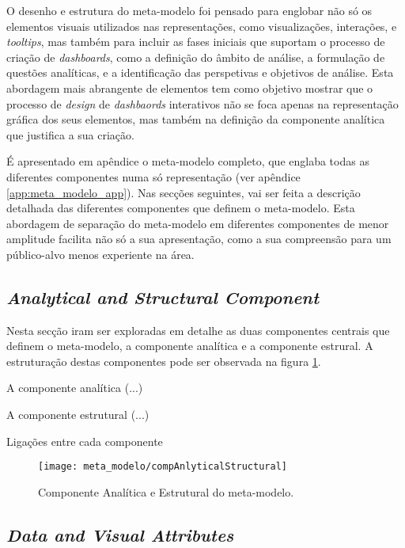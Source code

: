 O desenho e estrutura do meta-modelo foi pensado para englobar não só os elementos visuais utilizados nas representações, como visualizações, interações, e \textit{tooltips}, mas também para incluir as fases iniciais que suportam o processo de criação de \textit{dashboards}, como a definição do âmbito de análise, a formulação de questões analíticas, e a identificação das perspetivas e objetivos de análise. Esta abordagem mais abrangente de elementos tem como objetivo mostrar que o processo de \textit{design} de \textit{dashbaords} interativos não se foca apenas na representação gráfica dos seus elementos, mas também na definição da componente analítica que justifica a sua criação.

É apresentado em apêndice o meta-modelo completo, que englaba todas as diferentes componentes numa só representação (ver apêndice \ref{app:meta_modelo_app}). Nas secções seguintes, vai ser feita a descrição detalhada das diferentes componentes que definem o meta-modelo. Esta abordagem de separação do meta-modelo em diferentes componentes de menor amplitude facilita não só a sua apresentação, como a sua compreensão para um público-alvo menos experiente na área.

\subsection{\textit{Analytical and Structural Component}} %
\label{sub:anal_struct_comp}

Nesta secção iram ser exploradas em detalhe as duas componentes centrais que definem o meta-modelo, a componente analítica e a componente estrural. A estruturação destas componentes pode ser observada na figura \ref{fig:comp_anal_struct}.

A componente analítica (...)

A componente estrutural (...)

Ligações entre cada componente

\begin{figure}[htbp]
  \texttt{[image: meta\_modelo/compAnlyticalStructural]}
  \caption{Componente Analítica e Estrutural do meta-modelo.}
  \label{fig:comp_anal_struct}
\end{figure}

\subsection{\textit{Data and Visual Attributes}} %
\label{sub:data_vis_attr}

